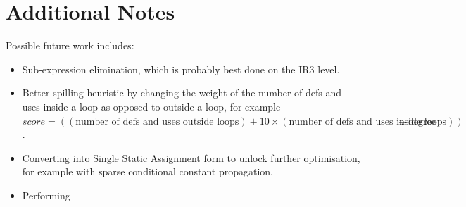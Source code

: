 \documentclass[nonacm, acmsmall, screen, 10pt]{acmart}
\begin{document}
\section{Additional Notes}
Possible future work includes:
\begin{itemize}
  \item Sub-expression elimination, which is probably best done on the IR3 level.
  \item Better spilling heuristic by changing the weight of the number of defs and uses inside a loop as opposed to outside a loop, for example $score = ((\text{number of defs and uses outside loops}) + 10 \times (\text{number of defs and uses inside loops})) \div \text{degree}$.
  \item Converting into Single Static Assignment form to unlock further optimisation, for example with sparse conditional constant propagation.
  \item Performing
\end{itemize}
\end{document}
